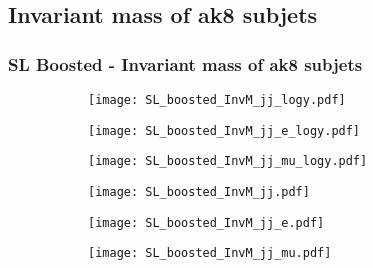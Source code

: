 \documentclass[aspectratio=169,8pt]{beamer}
\begin{document}
\subsection{Invariant mass of ak8 subjets}
\begin{frame}
\frametitle{SL Boosted - Invariant mass of ak8 subjets}
\begin{figure}
\captionsetup[subfigure]{labelformat=empty}
\begin{subfigure}{0.32\textwidth}
\texttt{[image: SL\_boosted\_InvM\_jj\_logy.pdf]}
\vspace*{-0.15cm}
\end{subfigure}
\hfil
\begin{subfigure}{0.32\textwidth}
\texttt{[image: SL\_boosted\_InvM\_jj\_e\_logy.pdf]}
\vspace*{-0.15cm}
\end{subfigure}
\hfil
\begin{subfigure}{0.32\textwidth}
\texttt{[image: SL\_boosted\_InvM\_jj\_mu\_logy.pdf]}
\vspace*{-0.15cm}
\end{subfigure}
\hfil
\begin{subfigure}{0.32\textwidth}
\texttt{[image: SL\_boosted\_InvM\_jj.pdf]}
\vspace*{-0.15cm}
\end{subfigure}
\hfil
\begin{subfigure}{0.32\textwidth}
\texttt{[image: SL\_boosted\_InvM\_jj\_e.pdf]}
\vspace*{-0.15cm}
\end{subfigure}
\hfil
\begin{subfigure}{0.32\textwidth}
\texttt{[image: SL\_boosted\_InvM\_jj\_mu.pdf]}
\vspace*{-0.15cm}
\end{subfigure}
\hfil
\end{figure}
\end{frame}
\newpage
\end{document}
